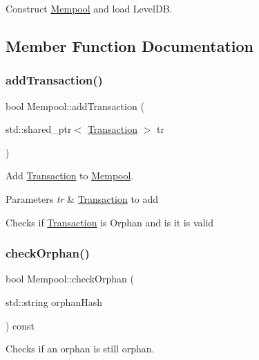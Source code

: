 Construct \mbox{\hyperlink{classMempool}{Mempool}} and load Level\+DB. 



\subsection{Member Function Documentation}
\mbox{\label{classMempool_a7f1fff7b367c389ed3c8b847dde46add}} 
\subsubsection{\texorpdfstring{add\+Transaction()}{addTransaction()}}
{\footnotesize\ttfamily bool Mempool\+::add\+Transaction (\begin{DoxyParamCaption}\item[{std\+::shared\+\_\+ptr$<$ \mbox{\hyperlink{classTransaction}{Transaction}} $>$}]{tr }\end{DoxyParamCaption})}



Add \mbox{\hyperlink{classTransaction}{Transaction}} to \mbox{\hyperlink{classMempool}{Mempool}}. 


\begin{DoxyParams}{Parameters}
{\em tr} & \mbox{\hyperlink{classTransaction}{Transaction}} to add\\
\hline
\end{DoxyParams}
Checks if \mbox{\hyperlink{classTransaction}{Transaction}} is Orphan and is it is valid \mbox{\label{classMempool_a589b0f1f4f88862bab6627771574e297}} 
\subsubsection{\texorpdfstring{check\+Orphan()}{checkOrphan()}}
{\footnotesize\ttfamily bool Mempool\+::check\+Orphan (\begin{DoxyParamCaption}\item[{std\+::string}]{orphan\+Hash }\end{DoxyParamCaption}) const\hspace{0.3cm}{\ttfamily [private]}}



Checks if an orphan is still orphan. 


